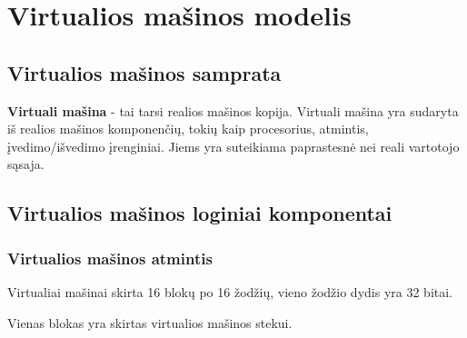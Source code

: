 \section{Virtualios mašinos modelis}
	\subsection{Virtualios mašinos samprata}
	\textbf{Virtuali mašina} - tai tarsi realios mašinos kopija. Virtuali mašina yra sudaryta iš realios mašinos komponenčių, tokių kaip procesorius, atmintis, įvedimo/išvedimo įrenginiai. Jiems yra suteikiama paprastesnė nei reali vartotojo sąsaja.
	
	\subsection{Virtualios mašinos loginiai komponentai}
	\subsubsection{Virtualios mašinos atmintis}
	Virtualiai mašinai skirta 16 blokų po 16 žodžių, vieno žodžio dydis yra 32 bitai.
	
	Vienas blokas yra skirtas virtualios mašinos stekui.
